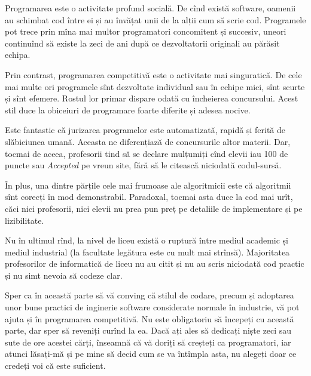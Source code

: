 \documentclass[../main.tex]{subfiles}
\begin{document}
Programarea este o activitate profund socială. De cînd există software, oamenii au schimbat cod între ei și au învățat unii de la alții cum să scrie cod. Programele pot trece prin mîna mai multor programatori concomitent și succesiv, uneori continuînd să existe la zeci de ani după ce dezvoltatorii originali au părăsit echipa.

Prin contrast, programarea competitivă este o activitate mai singuratică. De cele mai multe ori programele sînt dezvoltate individual sau în echipe mici, sînt scurte și sînt efemere. Rostul lor primar dispare odată cu încheierea concursului. Acest stil duce la obiceiuri de programare foarte diferite și adesea nocive.

Este fantastic că jurizarea programelor este automatizată, rapidă și ferită de slăbiciunea umană. Aceasta ne diferențiază de concursurile altor materii. Dar, tocmai de aceea, profesorii tind să se declare mulțumiți cînd elevii iau 100 de puncte sau \textit{Accepted} pe vreun site, fără să le citească niciodată codul-sursă.

În plus, una dintre părțile cele mai frumoase ale algoritmicii este că algoritmii sînt corecți în mod demonstrabil. Paradoxal, tocmai asta duce la cod mai urît, căci nici profesorii, nici elevii nu prea pun preț pe detaliile de implementare și pe lizibilitate.

Nu în ultimul rînd, la nivel de liceu există o ruptură între mediul academic și mediul industrial (la facultate legătura este cu mult mai strînsă). Majoritatea profesorilor de informatică de liceu nu au citit și nu au scris niciodată cod practic și nu simt nevoia să codeze clar.

Sper ca în această parte să vă conving că stilul de codare, precum și adoptarea unor bune practici de inginerie software considerate normale în industrie, vă pot ajuta și în programarea competitivă. Nu este obligatoriu să începeți cu această parte, dar sper să reveniți curînd la ea. Dacă ați ales să dedicați niște zeci sau sute de ore acestei cărți, înseamnă că vă doriți să creșteți ca programatori, iar atunci lăsați-mă și pe mine să decid cum se va întîmpla asta, nu alegeți doar ce credeți voi că este suficient. 
\end{document}
